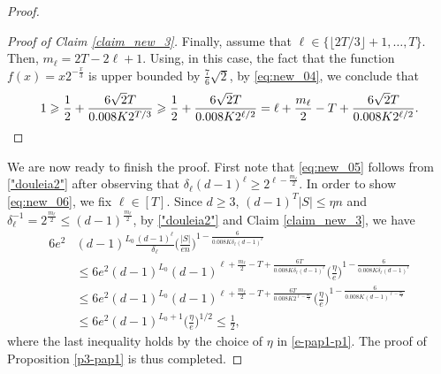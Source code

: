\documentclass[11pt,leqno]{amsart}
\theoremstyle{remark}
\theoremstyle{plain}
\begin{document}
\begin{proof}
\begin{proof}[Proof of Claim \ref{claim_new_3}]
Finally, assume that $\ell \in \{\lfloor2T/3\rfloor+1,\dots,T\}$.
Then, $m_\ell = 2T - 2\ell +1$. Using, in this case, the fact that the function $f(x)=x2^{-\frac{x}{3}}$ is upper bounded by $\frac{7}{6}\sqrt{2}$, by \eqref{eq:new_04}, we conclude that
\[ 1\geqslant \frac{1}{2} + \frac{6\sqrt{2}T}{0.008 K 2^{T/3}} \geqslant
\frac{1}{2} + \frac{6\sqrt{2}T}{0.008 K 2^{\ell/2}}=
\ell +\frac{m_\ell}{2} -T + \frac{6\sqrt{2}T}{0.008 K 2^{\ell/2}}. \qedhere \]
\end{proof}
We are now ready to finish the proof.
First note that \eqref{eq:new_05} follows from \eqref{"douleia2"}
after observing that $\delta_\ell (d-1)^\ell \geqslant 2^{\ell-\frac{m_\ell}{2}}$.
In order to show \eqref{eq:new_06}, we fix $\ell\in [T]$. Since $d\geqslant3$, $(d-1)^T|S|\leqslant \eta n$
and $\delta_\ell^{-1} = 2^{\frac{m_\ell}{2}} \leqslant (d-1)^{\frac{m_\ell}{2}}$, by \eqref{"douleia2"} and
Claim \ref{claim_new_3}, we have
\begin{align*}
 6e^2&(d-1)^{L_0}\frac{(d-1)^\ell}{\delta_\ell} \Big(\frac{|S|}{en}\Big)^{1-\frac{6}{0.008 K \delta_\ell (d-1)^\ell}} \\
  & \leqslant 6e^2(d-1)^{L_0}(d-1)^{\ell+\frac{m_\ell}{2}-T+\frac{6T}{0.008 K \delta_\ell (d-1)^\ell}}
  \Big(\frac{\eta}{e}\Big)^{1-\frac{6}{0.008 K \delta_\ell (d-1)^{\ell}}} \\
  & \leqslant 6e^2(d-1)^{L_0}(d-1)^{\ell+\frac{m_\ell}{2}-T+\frac{6T}{0.008 K 2^{\ell-\frac{m_\ell}{2}}}}
  \Big(\frac{\eta}{e}\Big)^{1-\frac{6}{0.008 K (d-1)^{\ell-\frac{m_\ell}{2}}}} \\
  & \leqslant 6e^2(d-1)^{L_0+1} \Big(\frac{\eta}{e}\Big)^{1/2} \leqslant\frac{1}{2},
\end{align*}
where the last inequality holds by the choice of $\eta$ in \eqref{e-pap1-p1}. The proof of Proposition \ref{p3-pap1}
is thus completed.
\end{proof}
\end{document}
